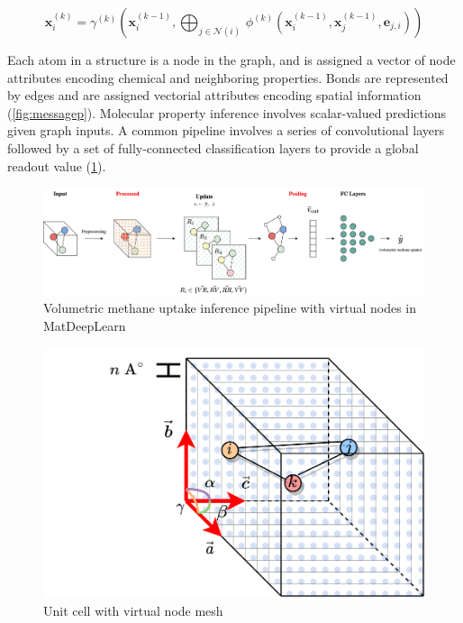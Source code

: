 \documentclass{lxaiproposal}
\begin{document}
\begin{equation}
    \mathbf{x}_i^{(k)} = \gamma^{(k)} \left( \mathbf{x}_i^{(k-1)}, \bigoplus_{j \in \mathcal{N}(i)} \, \phi^{(k)}\left(\mathbf{x}_i^{(k-1)}, \mathbf{x}_j^{(k-1)},\mathbf{e}_{j,i}\right) \right)
    \label{eq:mpupdate}
\end{equation}

Each atom in a structure is a node in the graph, and is assigned a vector of node attributes encoding chemical and neighboring properties. Bonds are represented by edges and are assigned vectorial attributes encoding spatial information (\ref{fig:messagep}). Molecular property inference involves scalar-valued predictions given graph inputs. A common pipeline involves a series of convolutional layers followed by a set of fully-connected classification layers to provide a global readout value (\ref{fig:pipeline}).

\begin{figure}[h]
    \centering
    \includegraphics[width=\textwidth]{mdl-vn-pipeline.drawio.png}
    \caption{Volumetric methane uptake inference pipeline with virtual nodes in MatDeepLearn\cite{fung2021benchmarking}}
    \label{fig:pipeline}
\end{figure}

\begin{figure}
    \centering
    \includegraphics[scale=0.25]{unitcell-vn.drawio.png}
    \caption{Unit cell with virtual node mesh}
    \label{fig:unitcell}
\end{figure}
\end{document}
